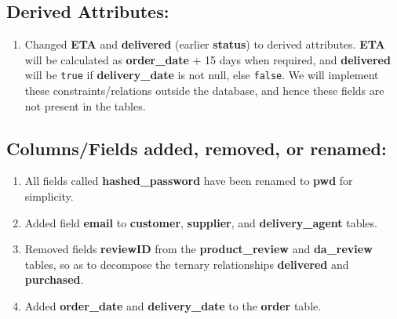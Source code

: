 \documentclass[12pt]{report}
\begin{document}
    \subsection*{Derived Attributes:}
    \begin{enumerate}
        \item
        Changed \textbf{ETA} and \textbf{delivered} (earlier \textbf{status}) to derived attributes.
        \textbf{ETA} will be calculated as \textbf{order\_date} + 15 days when required, and \textbf{delivered} will be \verb|true| if \textbf{delivery\_date} is not null, else \verb|false|.
        We will implement these constraints/relations outside the database, and hence these fields are not present in the tables.
    \end{enumerate}
    \pagebreak

    \subsection*{Columns/Fields added, removed, or renamed:}
    \begin{enumerate}
        \item
        All fields called \textbf{hashed\_password} have been renamed to \textbf{pwd} for simplicity.
        \item
        Added field \textbf{email} to \textbf{customer}, \textbf{supplier}, and \textbf{delivery\_agent} tables.
        \item
        Removed fields \textbf{reviewID} from the \textbf{product\_review} and \textbf{da\_review} tables, so as to decompose the ternary relationships \textbf{delivered} and \textbf{purchased}.
        \item
        Added \textbf{order\_date} and \textbf{delivery\_date} to the \textbf{order} table.
    \end{enumerate}
\end{document}
